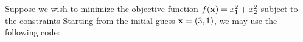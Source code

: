 \documentclass{galahad}
\newcommand{\package}{epf}
\begin{document}
\galexamples
Suppose we wish to minimize the objective function
$f({\mathbf{x}}) = x_1^2 + x_2^2$ subject to the constraints
Starting from the initial guess ${\mathbf{x}} = (3,1)$, we may use the following code:

\renewcommand{\packagedir}{\galahaddir/src/forthcoming/\package}
{\tt \small
\VerbatimInput{\packageexample}
}
\noindent
{\tt \small
\VerbatimInput{\packageresults}
}
\noindent
\end{document}

